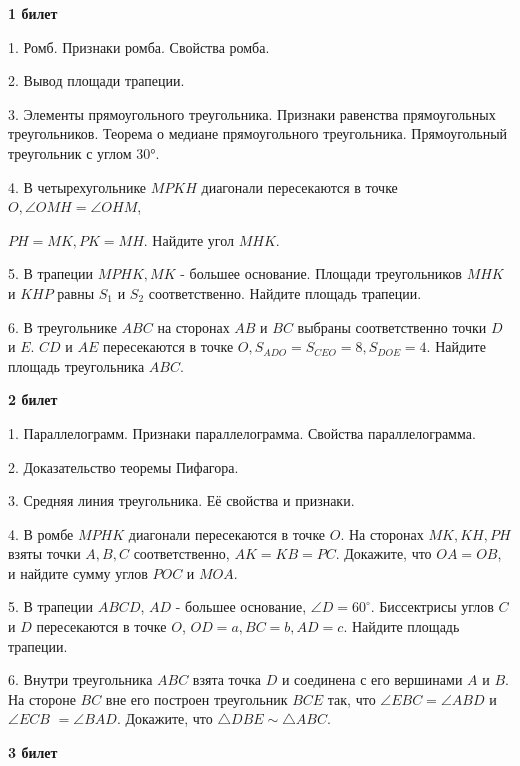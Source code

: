 \centerline{\bf \Huge }

\centerline{\bf \Huge 1 билет}
\centerline{\bf \Huge }

1. Ромб. Признаки ромба. Свойства ромба.

2. Вывод площади трапеции.

3. Элементы прямоугольного треугольника. Признаки равенства прямоугольных треугольников. Теорема о медиане прямоугольного треугольника. Прямоугольный треугольник с углом 30°.

4. В четырехугольнике $MPKH$ диагонали пересекаются в точке $O, \angle O M H=\angle O H M$,

$P H=M K, P K=M H$. Найдите угол $M H K$.


5. В трапеции $MPHK, MK$ - большее основание. Площади треугольников $M H K$ и $K H P$ равны $S_1$ и $S_2$ соответственно. Найдите площадь трапеции.


6. В треугольнике $A B C$ на сторонах $A B$ и $B C$ выбраны соответственно точки $D$ и $E$. $C D$ и $A E$ пересекаются в точке $O, S_{A D O}=S_{C E O}=8, S_{D O E}=4$. Найдите площадь треугольника $A B C$.






\centerline{\bf \Huge }
\centerline{\bf \Huge 2 билет}
\centerline{\bf \Huge }

1. Параллелограмм. Признаки параллелограмма. Свойства параллелограмма.

2. Доказательство теоремы Пифагора.

3. Средняя линия треугольника. Её свойства и признаки.

4. В ромбе $M P H K$ диагонали пересекаются в точке $O$. На сторонах $MK, KH, PH$ взяты точки $A, B, C$ соответственно, $A K=K B=P C$. Докажите, что $O A=O B$, и найдите сумму углов $POC$ и $MOA$.

5. В трапеции $A B C D$, $AD$ - большее основание, $\angle D=60^{\circ}$. Биссектрисы углов $C$ и $D$ пересекаются в точке $O$, $O D=a, B C=b, A D=c$. Найдите площадь трапеции.

6. Внутри треугольника $A B C$ взята точка $D$ и соединена с его вершинами $A$ и $B$. На стороне $B C$ вне его построен треугольник $B C E$ так, что $\angle E B C=\angle A B D$ и $\angle E C B$ $=\angle B A D$. Докажите, что $\triangle D B E \sim \triangle A B C$.





\centerline{\bf \Huge }
\centerline{\bf \Huge 3 билет}
\centerline{\bf \Huge }

